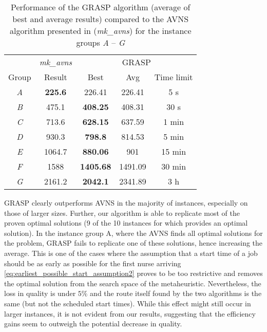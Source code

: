 \documentclass[a4paper,11pt]{elsarticle}
\begin{document}
\begin{table}
	\centering
	\caption{Performance of the GRASP algorithm (average of best and average results) compared to the AVNS algorithm presented in \cite{Mankowska2014} (\emph{mk\_avns}) for the instance groups \emph{A} -- \emph{G}}
	\begin{tabular}{c|c|ccc}
		\hline
		        &  \emph{mk\_avns}    &   \multicolumn{3}{c}{GRASP} \\
		Group   &   Result    &   Best        &   Avg         &   Time limit\\ \hline
		\emph{A}    &   \textbf{225.6}  &   226.41  &   226.41      &   5 s\\
		\emph{B}    &   475.1   &   \textbf{408.25} &   408.31      &   30 s\\
		\emph{C}    &   713.6   &   \textbf{628.15} &   637.59      &   1 min\\
		\emph{D}    &   930.3   &   \textbf{798.8}  &   814.53      &   5 min\\
		\emph{E}    &   1064.7  &   \textbf{880.06} &   901         &   15 min\\
		\emph{F}    &   1588    &   \textbf{1405.68}&   1491.09     &   30 min\\
		\emph{G}    &   2161.2  &   \textbf{2042.1} &   2341.89     &   3 h\\

		\hline
	\end{tabular}
	\label{tab:group_table_mk_avg_best}
\end{table}

GRASP clearly outperforms AVNS in the majority of instances, especially on those of larger sizes.
Further, our algorithm is able to replicate most of the proven optimal solutions (9 of the 10 instances for which \cite{Mankowska2014} provides an optimal solution). In the instance group A, where the AVNS finds all optimal solutions for the problem, GRASP fails to replicate one of these solutions, hence increasing the average. This is one of the cases where the assumption that a start time of a job should be as early as possible for the first nurse arriving \eqref{eq:earliest_possible_start_assumption2} proves to be too restrictive and removes the optimal solution from the search space of the metaheuristic. Nevertheless, the loss in quality is under $5\%$ and the route itself found by the two algorithms is the same (but not the scheduled start times). While this effect might still occur in larger instances, it is not evident from our results, suggesting that the efficiency gains seem to outweigh the potential decrease in quality.
\end{document}
